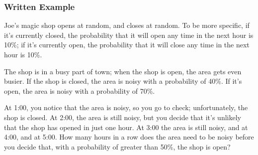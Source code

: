 \documentclass{beamer}
\begin{document}
\begin{frame}
  \frametitle{Written Example}

  Joe's magic shop opens at random, and closes at random.  To be more
  specific, if it's currently closed, the probability that it will
  open any time in the next hour is 10\%; if it's currently open, the
  probability that it will close any time in the next hour is 10\%.

  The shop is in a busy part of town; when the shop is open, the area
  gets even busier.  If the shop is closed, the area is noisy with a
  probability of 40\%.  If it's open, the area is noisy with a
  probability of 70\%.

  At 1:00, you notice that the area is noisy, so you go to check;
  unfortunately, the shop is closed.  At 2:00, the area is still
  noisy, but you decide that it's unlikely that the shop has opened in
  just one hour.  At 3:00 the area is still noisy, and at 4:00, and at
  5:00.  How many hours in a row does the area need to be noisy before
  you decide that, with a probability of greater than 50\%, the shop
  is open?
\end{frame}
\end{document}
